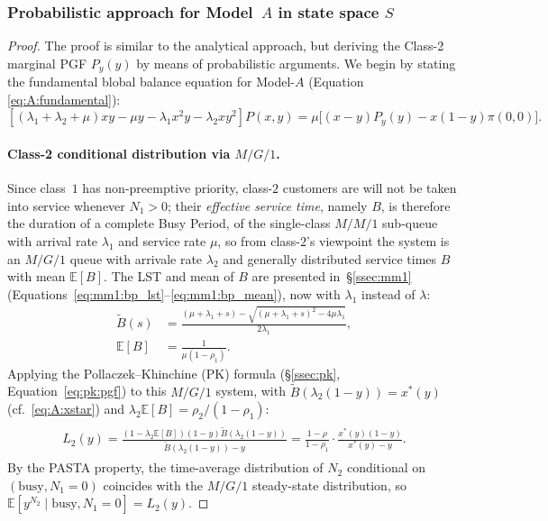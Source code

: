 \subsubsection{Probabilistic approach for Model~\texorpdfstring{$A$}{A} in state space \texorpdfstring{$S$}{S}}\label{sssec:A:probabilistic}
\begin{proof}
    The proof is similar to the analytical approach, but deriving the Class-2 marginal PGF $P_y(y)$ by means of probabilistic arguments. We begin by stating the fundamental blobal balance equation for Model-$A$ (Equation \eqref{eq:A:fundamental}):
    \begin{equation}
        \left[ (\lambda_1 + \lambda_2 + \mu) xy - \mu y - \lambda_1 x^2 y - \lambda_2 x y^2 \right] P(x,y) =
        \mu \big[ (x-y) P_y(y) - x(1-y) \pi(0,0) \big].
        \label{eq:A:prob_starting}
    \end{equation}

    \paragraph{Class-2 conditional distribution via $M/G/1$.}
    Since class~$1$ has non-preemptive priority, class-$2$ customers are will not be taken into service
    whenever $N_1>0$; their \emph{effective service time}, namely $B$, is therefore the duration of a
    complete Busy Period, of the single-class $M/M/1$ sub-queue with arrival rate $\lambda_1$ and service rate $\mu$, so from class-$2$'s viewpoint the system is an $M/G/1$ queue with arrivale rate $\lambda_2$ and generally distributed service times $B$ with mean $\mathbb{E}[B]$. The LST and mean of $B$ are presented
    in~\S\ref{ssec:mm1} (Equations~\eqref{eq:mm1:bp_lst}--\eqref{eq:mm1:bp_mean}), now
    with $\lambda_1$ instead of $\lambda$:
    \begin{align}
        \widetilde{B}(s) &= \frac{(\mu+\lambda_1+s) - \sqrt{(\mu + \lambda_1 + s)^2-4\mu\lambda_1}}{2\lambda_1}, \label{eq:A:B_lst}\\
        \mathbb{E}[B] &= \frac{1}{\mu(1-\rho_1)}. \label{eq:A:B_mean}
    \end{align}
    Applying the Pollaczek--Khinchine (PK) formula (\S\ref{ssec:pk},
    Equation~\eqref{eq:pk:pgf}) to this $M/G/1$ system, with
    $\widetilde{B}(\lambda_2(1-y))=x^*(y)$ (cf.~\eqref{eq:A:xstar}) and
    $\lambda_2\mathbb{E}[B]=\rho_2/(1-\rho_1)$:
    \begin{align}
        \begin{split}
            L_2(y) = \frac{(1 - \lambda_2 \mathbb{E}[B]) (1-y) \widetilde{B}(\lambda_2(1-y))}{\widetilde{B}(\lambda_2(1-y)) - y}
                    = \frac{1-\rho}{1-\rho_1} \cdot \frac{x^*(y)(1-y)}{x^*(y) - y}.
        \end{split}
        \label{eq:A:pk_formula}
    \end{align}
    By the PASTA property, the time-average distribution of $N_2$ conditional on
    $(\text{busy},N_1=0)$ coincides with the $M/G/1$ steady-state distribution, so
    $\mathbb{E}[y^{N_2}\mid\text{busy},N_1=0]=L_2(y)$.


\end{proof}
